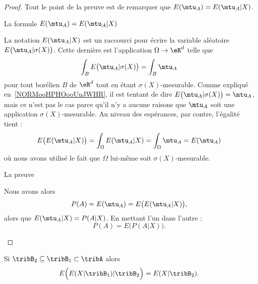 \begin{proof}
    Tout le point de la preuve est de remarquer que \( E(\mtu_A)=E(\mtu_A|X)\).

    \begin{subproof}
    \item[La formule \( E(\mtu_A)=E(\mtu_A|X)\)]

     La notation \( E(\mtu_A|X)\) est un raccourci pour écrire la variable aléatoire \( E\big(\mtu_A|\sigma(X)\big)\). Cette dernière est l'application \( \Omega\to \eR^d\) telle que
    \begin{equation}
        \int_B E\big( \mtu_A|\sigma(X) \big)=\int_B\mtu_A
    \end{equation}
    pour tout borélien \( B\) de \( \eR^d\) tout en étant \( \sigma(X)\)-mesurable. Comme expliqué en~\ref{NORMooHPHOooUuJWHR}, il est tentant de dire \( E\big( \mtu_A|\sigma(X) \big)=\mtu_A\), mais ce n'est pas le cas parce qu'il n'y a aucune raisons que \( \mtu_A\) soit une application \( \sigma(X)\)-mesurable. Au niveau des espérances, par contre, l'égalité tient :
    \begin{equation}
            E\big( E(\mtu_A|X) \big)=\int_{\Omega}E(\mtu_A|X)=\int_{\Omega}\mtu_A=E(\mtu_A)
    \end{equation}
    où nous avons utilisé le fait que \( \Omega\) lui-même soit \( \sigma(X)\)-mesurable.

        \item[La preuve]

            Nous avons alors
            \begin{equation}
                P(A)=E(\mtu_A)=E\big( E(\mtu_A|X) \big),
            \end{equation}
            alors que \( E(\mtu_A|X)=P(A|X)\). En mettant l'un dans l'autre :
            \begin{equation}
                P(A)=E\big( P(A|X) \big).
            \end{equation}
    \end{subproof}
\end{proof}

\begin{proposition}     \label{PropRGcscXj}
    Si \( \tribB_2\subseteq\tribB_1\subset\tribA\) alors
    \begin{equation}
        E\Big( E(X|\tribB_1)|\tribB_2 \Big)=E(X|\tribB_2).
    \end{equation}
\end{proposition}

